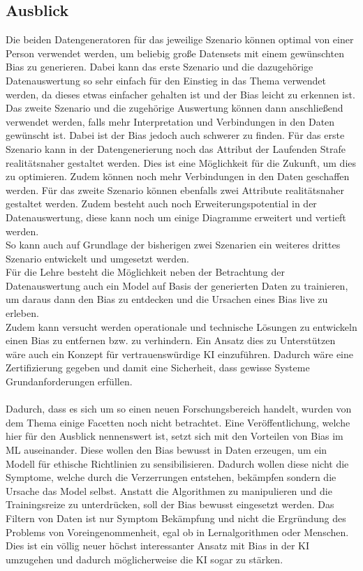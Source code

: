 \begin{onehalfspace}
\section{Ausblick}
\label{ausblick}
Die beiden Datengeneratoren für das jeweilige Szenario können optimal von einer Person verwendet werden, um beliebig große Datensets mit einem gewünschten Bias zu generieren. Dabei kann das erste Szenario und die dazugehörige Datenauswertung so sehr einfach für den Einstieg in das Thema verwendet werden, da dieses etwas einfacher gehalten ist und der Bias leicht zu erkennen ist. Das zweite Szenario und die zugehörige Auswertung können dann anschließend verwendet werden, falls mehr Interpretation und Verbindungen in den Daten gewünscht ist. Dabei ist der Bias jedoch auch schwerer zu finden. Für das erste Szenario kann in der Datengenerierung noch das Attribut der Laufenden Strafe realitätsnaher gestaltet werden. Dies ist eine Möglichkeit für die Zukunft, um dies zu optimieren. Zudem können noch mehr Verbindungen in den Daten geschaffen werden. Für das zweite Szenario können ebenfalls zwei Attribute realitätsnaher gestaltet werden. Zudem besteht auch noch Erweiterungspotential in der Datenauswertung, diese kann noch um einige Diagramme erweitert und vertieft werden.\\
So kann auch auf Grundlage der bisherigen zwei Szenarien ein weiteres drittes Szenario entwickelt und umgesetzt werden.\\
Für die Lehre besteht die Möglichkeit neben der Betrachtung der Datenauswertung auch ein Model auf Basis der generierten Daten zu trainieren, um daraus dann den Bias zu entdecken und die Ursachen eines Bias live zu erleben.\\ 
Zudem kann versucht werden operationale und technische Lösungen zu entwickeln einen Bias zu entfernen bzw. zu verhindern. Ein Ansatz dies zu Unterstützen wäre auch ein Konzept für vertrauenswürdige KI einzuführen. Dadurch wäre eine Zertifizierung gegeben und damit eine Sicherheit, dass gewisse Systeme Grundanforderungen erfüllen.\\\\
Dadurch, dass es sich um so einen neuen Forschungsbereich handelt, wurden von dem Thema einige Facetten noch nicht betrachtet. Eine Veröffentlichung, welche hier für den Ausblick nennenswert ist, setzt sich mit den Vorteilen von Bias im ML auseinander. Diese wollen den Bias bewusst in Daten erzeugen, um ein Modell für ethische Richtlinien zu sensibilisieren. Dadurch wollen diese nicht die Symptome, welche durch die Verzerrungen entstehen, bekämpfen sondern die Ursache das Model selbst. Anstatt die Algorithmen zu manipulieren und die Trainingsreize zu unterdrücken, soll der Bias bewusst eingesetzt werden. Das Filtern von Daten ist nur Symptom Bekämpfung und nicht die Ergründung des Problems von Voreingenommenheit, egal ob in Lernalgorithmen oder Menschen. Dies ist ein völlig neuer höchst interessanter Ansatz mit Bias in der KI umzugehen und dadurch möglicherweise die KI sogar zu stärken.\cite{Fabi2022}
\end{onehalfspace}
\newpage